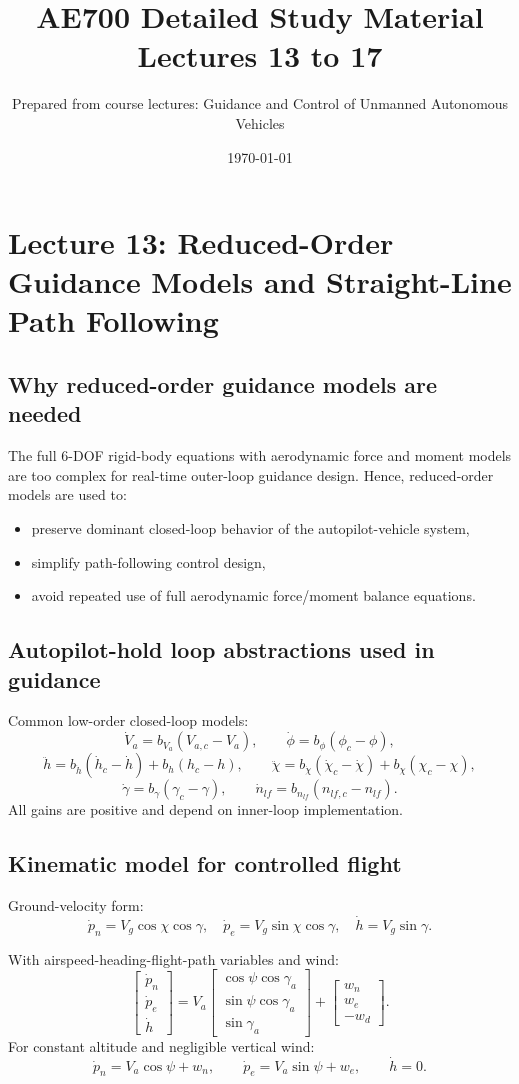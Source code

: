 \documentclass[11pt,a4paper]{article}
\title{AE700 Detailed Study Material\\Lectures 13 to 17}
\author{Prepared from course lectures: Guidance and Control of Unmanned Autonomous Vehicles}
\date{\today}
\begin{document}
\maketitle
\tableofcontents
\newpage

\section{Lecture 13: Reduced-Order Guidance Models and Straight-Line Path Following}

\subsection{Why reduced-order guidance models are needed}
The full 6-DOF rigid-body equations with aerodynamic force and moment models are too complex for real-time outer-loop guidance design. Hence, reduced-order models are used to:
\begin{itemize}
  \item preserve dominant closed-loop behavior of the autopilot-vehicle system,
  \item simplify path-following control design,
  \item avoid repeated use of full aerodynamic force/moment balance equations.
\end{itemize}

\subsection{Autopilot-hold loop abstractions used in guidance}
Common low-order closed-loop models:
\[
\dot V_a=b_{V_a}(V_{a,c}-V_a), \qquad
\dot \phi=b_{\phi}(\phi_c-\phi),
\]
\[
\ddot h=b_{\dot h}(\dot h_c-\dot h)+b_h(h_c-h), \qquad
\ddot \chi=b_{\dot \chi}(\dot \chi_c-\dot \chi)+b_{\chi}(\chi_c-\chi),
\]
\[
\dot \gamma=b_{\gamma}(\gamma_c-\gamma), \qquad
\dot n_{lf}=b_{n_{lf}}(n_{lf,c}-n_{lf}).
\]
All gains are positive and depend on inner-loop implementation.

\subsection{Kinematic model for controlled flight}
Ground-velocity form:
\[
\dot p_n=V_g\cos\chi\cos\gamma,\quad
\dot p_e=V_g\sin\chi\cos\gamma,\quad
\dot h=V_g\sin\gamma.
\]

With airspeed-heading-flight-path variables and wind:
\[
\begin{bmatrix}\dot p_n\\ \dot p_e\\ \dot h\end{bmatrix}
=
V_a\begin{bmatrix}\cos\psi\cos\gamma_a\\ \sin\psi\cos\gamma_a\\ \sin\gamma_a\end{bmatrix}
+
\begin{bmatrix}w_n\\ w_e\\ -w_d\end{bmatrix}.
\]
For constant altitude and negligible vertical wind:
\[
\dot p_n=V_a\cos\psi+w_n,\qquad
\dot p_e=V_a\sin\psi+w_e,\qquad
\dot h=0.
\]
\end{document}
